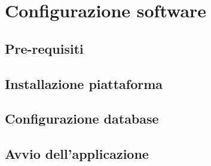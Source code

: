 \newpage
\section{Configurazione software}
\subsection{Pre-requisiti}

\subsection{Installazione piattaforma}

\subsection{Configurazione database}

\subsection{Avvio dell'applicazione}

